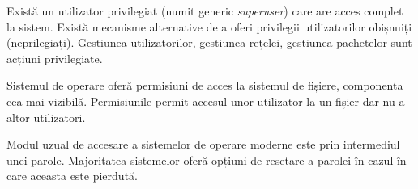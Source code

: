 Există un utilizator privilegiat (numit generic \textit{superuser}) care are acces complet la sistem.
Există mecanisme alternative de a oferi privilegii utilizatorilor obișnuiți (neprilegiați).
Gestiunea utilizatorilor, gestiunea rețelei, gestiunea pachetelor sunt acțiuni privilegiate.

Sistemul de operare oferă permisiuni de acces la sistemul de fișiere, componenta cea mai vizibilă.
Permisiunile permit accesul unor utilizator la un fișier dar nu a altor utilizatori.

Modul uzual de accesare a sistemelor de operare moderne este prin intermediul unei parole.
Majoritatea sistemelor oferă opțiuni de resetare a parolei în cazul în care aceasta este pierdută.
